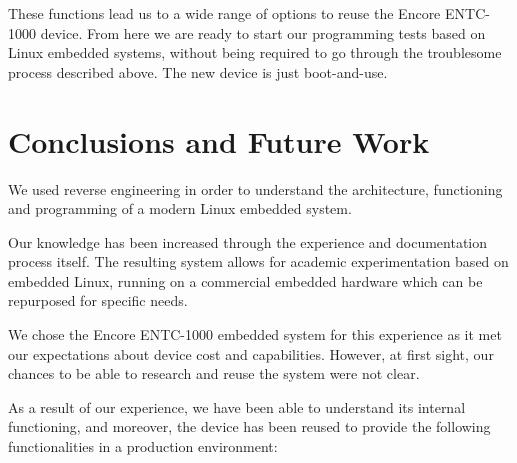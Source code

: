 \documentclass[conference]{IEEEtran}
\newcommand{\nota}[1]{}
\begin{document}
These functions lead us to a wide range of options to
reuse the Encore ENTC-1000 device. From here we are
ready to start our programming tests based on Linux embedded
systems, without being required to go through the troublesome
process described above. The new device is just boot-and-use.








\section{Conclusions and Future Work}

\nota{Se utilizó ingeniería inversa para entender la arquitectura, funcionamiento
y la programación de un sistema Linux embebido moderno.

La experiencia y documentación del proceso
nos permitió obtener mayor conocimiento del tema,
posibilitó la experimentación académica con Linux embebido, y
permitió el reuso de un sistema embebido comercial para necesidades
específicas.}

We used reverse engineering in order to understand the architecture, 
functioning and programming of a modern Linux embedded system.

Our knowledge has been increased through the experience and
documentation process itself. The resulting system allows for academic 
experimentation based on embedded Linux, running on a commercial 
embedded hardware which can be repurposed for specific needs. 

\nota{
Se seleccionó el hardware Encore ENTC-1000 porque cubre
las expectativas de prestaciones, aún cuando no se conocía,
en un primer momento, si sería posible estudiarlo y reutilizarlo.

Afortunadamente, y luego de esta experiencia, no sólo
se ha logrado entender el funcionamiento interno, sino que
tambien, se está reutilizando de manera productiva para
cumplir disintos roles :
}
We chose the Encore ENTC-1000 embedded system for this experience
as it met our expectations about device cost and capabilities. However, at first sight, our chances to be able to research and reuse the system were not clear.

As a result of our experience, we have been able to 
understand its internal functioning, and moreover, the device 
has been reused to provide the following functionalities in a 
production environment: 
\end{document}
